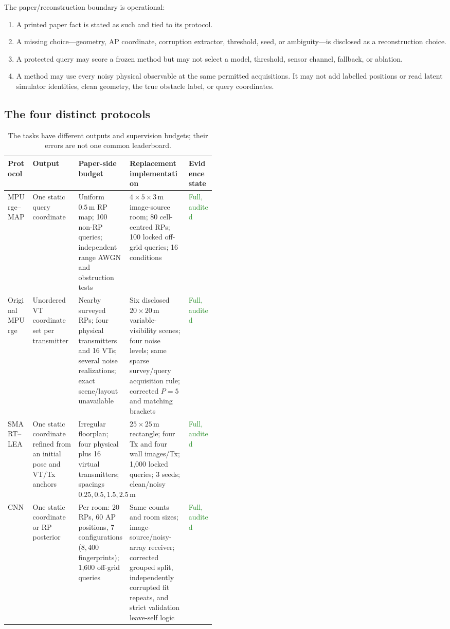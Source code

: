 \documentclass[10pt]{article}
\newcommand{\m}{\,\mathrm m}
\newcommand{\good}[1]{\textcolor{ForestGreen}{#1}}
\begin{document}
The paper/reconstruction boundary is operational:
\begin{enumerate}
\item A printed paper fact is stated as such and tied to its protocol.
\item A missing choice---geometry, AP coordinate, corruption extractor,
threshold, seed, or ambiguity---is disclosed as a reconstruction choice.
\item A protected query may score a frozen method but may not select a model,
threshold, sensor channel, fallback, or ablation.
\item A method may use every noisy physical observable at the same permitted
acquisitions.  It may not add labelled positions or read latent simulator
identities, clean geometry, the true obstacle label, or query coordinates.
\end{enumerate}

\subsection{The four distinct protocols}

\begin{table}[ht]
\centering\small
\begin{tabularx}{\linewidth}{@{}p{0.12\linewidth}p{0.22\linewidth}YYp{0.13\linewidth}@{}}
\toprule
Protocol & Output & Paper-side budget & Replacement implementation & Evidence state\\
\midrule
MPUrge--MAP & One static query coordinate & Uniform $0.5\m$ RP map; 100 non-RP queries; independent range AWGN and obstruction tests & $4\times5\times3\m$ image-source room; 80 cell-centred RPs; 100 locked off-grid queries; 16 conditions & \good{Full, audited}\\
Original MPUrge & Unordered VT coordinate set per transmitter & Nearby surveyed RPs; four physical transmitters and 16 VTs; several noise realizations; exact scene/layout unavailable & Six disclosed $20\times20\m$ variable-visibility scenes; four noise levels; same sparse survey/query acquisition rule; corrected $P=5$ and matching brackets & \good{Full, audited}\\
SMART--LEA & One static coordinate refined from an initial pose and VT/Tx anchors & Irregular floorplan; four physical plus 16 virtual transmitters; spacings $0.25,0.5,1.5,2.5\m$ & $25\times25\m$ rectangle; four Tx and four wall images/Tx; 1,000 locked queries; 3 seeds; clean/noisy & \good{Full, audited}\\
CNN & One static coordinate or RP posterior & Per room: 20 RPs, 60 AP positions, 7 configurations ($8{,}400$ fingerprints); 1,600 off-grid queries & Same counts and room sizes; image-source/noisy-array receiver; corrected grouped split, independently corrupted fit repeats, and strict validation leave-self logic & \good{Full, audited}\\
\bottomrule
\end{tabularx}
\caption{The tasks have different outputs and supervision budgets; their errors are not one common leaderboard.}
\end{table}
\end{document}

